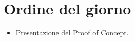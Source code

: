 \section{Ordine del giorno}

\begin{itemize}
\item Presentazione del Proof of Concept.
\end{itemize}